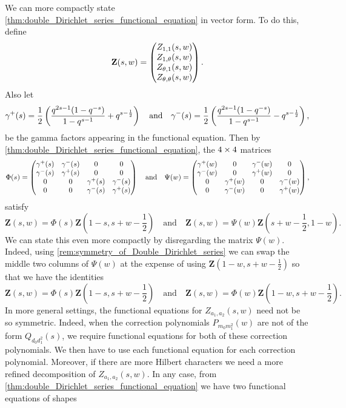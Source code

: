 \documentclass[12pt,reqno,oneside]{amsart}
\begin{document}
    We can more compactly state \cref{thm:double_Dirichlet_series_functional_equation} in vector form. To do this, define
    \[
        \mathbf{Z}(s,w) = \begin{pmatrix} Z_{1,1}(s,w) \\ Z_{1,\theta}(s,w) \\ Z_{\theta,1}(s,w) \\ Z_{\theta,\theta}(s,w) \end{pmatrix}.
    \]
    Also let
    \[
        \gamma^{+}(s) = \frac{1}{2}\left(\frac{q^{2s-1}(1-q^{-s})}{1-q^{s-1}}+q^{s-\frac{1}{2}}\right) \quad \text{and} \quad \gamma^{-}(s) = \frac{1}{2}\left(\frac{q^{2s-1}(1-q^{-s})}{1-q^{s-1}}-q^{s-\frac{1}{2}}\right),
    \]
    be the gamma factors appearing in the functional equation. Then by \cref{thm:double_Dirichlet_series_functional_equation}, the $4 \times 4$ matrices
    \[
        \Phi(s) = \begin{pmatrix} \gamma^{+}(s) & \gamma^{-}(s) & 0 & 0 \\ \gamma^{-}(s) & \gamma^{+}(s) & 0 & 0 \\ 0 & 0 & \gamma^{+}(s) & \gamma^{-}(s) \\ 0 & 0 & \gamma^{-}(s) & \gamma^{+}(s) \\ \end{pmatrix} \quad \text{and} \quad \Psi(w) = \begin{pmatrix} 
        \gamma^{+}(w) & 0 & \gamma^{-}(w) & 0 \\ 
        \gamma^{-}(w) & 0 & \gamma^{+}(w) & 0 \\ 
        0 & \gamma^{+}(w) & 0 & \gamma^{-}(w) \\ 
        0 & \gamma^{-}(w) & 0 & \gamma^{+}(w) \\ \end{pmatrix},
    \]
    satisfy
    \[
        \mathbf{Z}(s,w) = \Phi(s)\mathbf{Z}\left(1-s,s+w-\frac{1}{2}\right) \quad \text{and} \quad \mathbf{Z}(s,w) = \Psi(w)\mathbf{Z}\left(s+w-\frac{1}{2},1-w\right).
    \]
    We can state this even more compactly by disregarding the matrix $\Psi(w)$. Indeed, using \cref{rem:symmetry_of_Double_Dirichlet_series} we can swap the middle two columns of $\Psi(w)$ at the expense of using $\textbf{Z}\left(1-w,s+w-\frac{1}{2}\right)$ so that we have the identities
    \[
        \mathbf{Z}(s,w) = \Phi(s)\mathbf{Z}\left(1-s,s+w-\frac{1}{2}\right) \quad \text{and} \quad \mathbf{Z}(s,w) = \Phi(w)\mathbf{Z}\left(1-w,s+w-\frac{1}{2}\right).
    \]
    In more general settings, the functional equations for $Z_{a_{1},a_{2}}(s,w)$ need not be so symmetric. Indeed, when the correction polynomials $P_{m_{0}m_{1}^{2}}(w)$ are not of the form $Q_{d_{0}d_{1}^{2}}(s)$, we require functional equations for both of these correction polynomials. We then have to use each functional equation for each correction polynomial. Moreover, if there are more Hilbert characters we need a more refined decomposition of $Z_{a_{1},a_{2}}(s,w)$. In any case, from \cref{thm:double_Dirichlet_series_functional_equation} we have two functional equations of shapes
\end{document}
